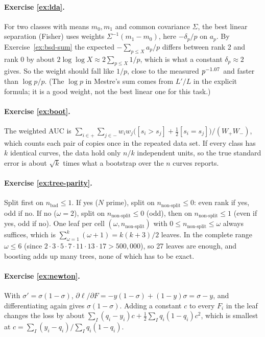 \documentclass[11pt]{article}
\theoremstyle{definition}
\theoremstyle{plain}
\theoremstyle{remark}
\renewcommand{\_}{\oldunderscore\allowbreak}
\begin{document}
\paragraph{Exercise \ref{ex:lda}.}
For two classes with means $m_0,m_1$ and common covariance $\Sigma$, the best linear separation
(Fisher) uses weights $\Sigma^{-1}(m_1-m_0)$, here $-\delta_p/p$ on $a_p$. By
Exercise~\ref{ex:bsd-sum} the expected $-\sum_{p\le X}a_p/p$ differs between rank 2 and rank 0 by
about $2\log\log X\approx2\sum_{p\le X}1/p$, which is what a constant $\delta_p\approx2$ gives.
So the weight should fall like $1/p$, close to the measured $p^{-1.07}$ and faster than
$\log p/p$. (The $\log p$ in Mestre's sum comes from $L'/L$ in the explicit formula; it is a
good weight, not the best linear one for this task.)

\paragraph{Exercise \ref{ex:boot}.}
The weighted AUC is $\sum_{i\in+}\sum_{j\in-}w_iw_j\bigl([s_i>s_j]+\tfrac12[s_i=s_j]\bigr)/(W_+W_-)$,
which counts each pair of copies once in the repeated data set. If every class has $k$
identical curves, the data hold only $n/k$ independent units, so the true standard error is
about $\sqrt k$ times what a bootstrap over the $n$ curves reports.

\paragraph{Exercise \ref{ex:tree-parity}.}
Split first on $n_{\text{bad}}\le1$. If yes ($N$ prime), split on $n_{\text{non-split}}\le0$:
even rank if yes, odd if no. If no ($\omega=2$), split on $n_{\text{non-split}}\le0$ (odd), then
on $n_{\text{non-split}}\le1$ (even if yes, odd if no). One leaf per cell $(\omega,n_{\text{non-split}})$
with $0\le n_{\text{non-split}}\le\omega$ always suffices, which is $\sum_{\omega=1}^k(\omega+1)=k(k+3)/2$
leaves. In the complete range $\omega\le6$ (since $2\cdot3\cdot5\cdot7\cdot11\cdot13\cdot17>500{,}000$),
so 27 leaves are enough, and boosting adds up many trees, none of which has to be exact.

\paragraph{Exercise \ref{ex:newton}.}
With $\sigma'=\sigma(1-\sigma)$,
$\partial\ell/\partial F=-y(1-\sigma)+(1-y)\sigma=\sigma-y$, and differentiating again gives
$\sigma(1-\sigma)$. Adding a constant $c$ to every $F_i$ in the leaf changes the loss by about
$\sum_I(q_i-y_i)c+\tfrac12\sum_Iq_i(1-q_i)c^2$, which is smallest at
$c=\sum_I(y_i-q_i)/\sum_Iq_i(1-q_i)$.
\end{document}
